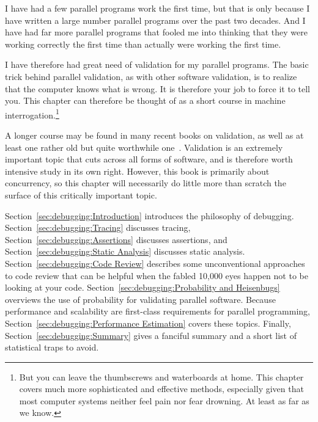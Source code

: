 
%

I have had a few parallel programs work the first time, but that is only
because I have written a large number parallel programs over the past two
decades.
And I have had far more parallel programs that fooled me into thinking
that they were working correctly the first time than actually were working
the first time.

I have therefore had great need of validation for my parallel programs.
The basic trick behind parallel validation, as with other software
validation, is to realize that the computer knows what is wrong.
It is therefore your job to force it to tell you.
This chapter can therefore be thought of as a short course in
machine interrogation.\footnote{
	But you can leave the thumbscrews and waterboards at home.
	This chapter covers much more sophisticated and effective
	methods, especially given that most computer
	systems neither feel pain nor fear drowning.
	At least as far as we know.}

A longer course may be found in many recent books on validation, as
well as at least one rather old but quite worthwhile
one~\cite{GlenfordJMyers1979}.
Validation is an extremely important topic that cuts across all forms
of software, and is therefore worth intensive study in its own right.
However, this book is primarily about concurrency, so this chapter
will necessarily do little more than scratch the surface of this
critically important topic.

Section~\ref{sec:debugging:Introduction}
introduces the philosophy of debugging.
Section~\ref{sec:debugging:Tracing}
discusses tracing,
Section~\ref{sec:debugging:Assertions}
discusses assertions, and
Section~\ref{sec:debugging:Static Analysis}
discusses static analysis.
Section~\ref{sec:debugging:Code Review}
describes some unconventional approaches to code review that can
be helpful when the fabled 10,000 eyes happen not to be looking at your code.
Section~\ref{sec:debugging:Probability and Heisenbugs}
overviews the use of probability for validating parallel software.
Because performance and scalability are first-class requirements
for parallel programming,
Section~\ref{sec:debugging:Performance Estimation} covers these
topics.
Finally,
Section~\ref{sec:debugging:Summary}
gives a fanciful summary and a short list of statistical traps to avoid.

